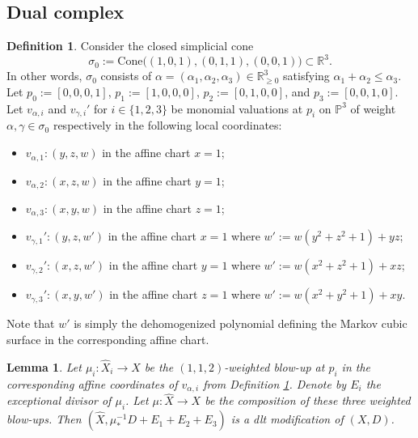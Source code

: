\documentclass[reqno, 12pt]{amsart}
\newtheorem{lem}[prop]{Lemma}
\theoremstyle{definition}
\newtheorem{defn}[prop]{Definition}
\newcommand{\bP}{\mathbb{P}}
\newcommand{\bR}{\mathbb{R}}
\newcommand{\hX}{\widehat{X}}
\newcommand{\Cone}{\mathrm{Cone}}
\numberwithin{equation}{section}
\begin{document}
\subsection{Dual complex}
\begin{defn}\label{def:monomial-val}
Consider the closed simplicial cone
\[
\sigma_0:= \Cone\bigl((1,0,1),(0,1,1),(0,0,1)\bigr) \subset \bR^3.
\]
In other words, $\sigma_0$ consists of $\alpha=(\alpha_1, \alpha_2, \alpha_3)\in \bR^3_{\geq 0}$ satisfying $\alpha_1 + \alpha_2 \leq \alpha_3$. Let $p_0:=[0,0,0,1]$, $p_1:=[1,0,0,0]$, $p_2:=[0,1,0,0]$, and $p_3:=[0,0,1,0]$.
Let $v_{\alpha,i}$ and $v_{\gamma,i}'$ for $i\in \{1,2,3\}$ be monomial valuations at $p_i$ on $\bP^3$ of weight $\alpha,\gamma\in \sigma_0$ respectively in the following local coordinates:
\begin{itemize}
    \item $v_{\alpha,1}: (y,z,w)$ in the affine chart $x=1$;
    \item $v_{\alpha,2}: (x,z,w)$ in the affine chart $y=1$;
    \item $v_{\alpha,3}: (x,y,w)$ in the affine chart $z=1$;
    \item $v_{\gamma,1}': (y,z,w')$ in the affine chart $x=1$ where $w':=w(y^2+z^2 + 1)+yz$;
    \item $v_{\gamma,2}': (x,z,w')$ in the affine chart $y=1$ where $w':=w(x^2+z^2 + 1)+xz$;
    \item $v_{\gamma,3}': (x,y,w')$ in the affine chart $z=1$ where $w':=w(x^2+y^2 + 1)+xy$.
\end{itemize}
Note that $w'$ is simply the dehomogenized polynomial defining the Markov cubic surface in the corresponding affine chart.
\end{defn}

\begin{lem}\label{lem:dltmodel}
Let $\mu_i:\hX_i \to X$ be the $(1,1,2)$-weighted blow-up at $p_i$ in the corresponding affine coordinates of $v_{\alpha, i}$ from Definition \ref{def:monomial-val}. Denote by $E_i$ the exceptional divisor of $\mu_i$. Let $\mu: \hX \to X$ be the composition of these three weighted blow-ups. Then $(\hX, \mu_*^{-1} D + E_1+E_2+E_3)$ is a dlt modification of $(X,D)$. 
\end{lem}
\end{document}
